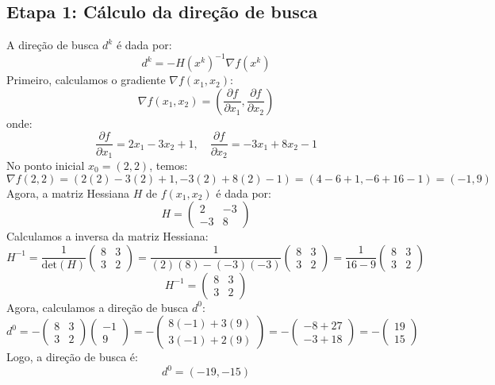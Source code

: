 \documentclass[a4paper, 12pt]{article}
\begin{document}
\subsection{Etapa 1: Cálculo da direção de busca}
A direção de busca \( d^k \) é dada por:
\[
d^k = -H(x^k)^{-1} \nabla f(x^k)
\]
Primeiro, calculamos o gradiente \( \nabla f(x_1, x_2) \):
\[
\nabla f(x_1, x_2) = \left( \frac{\partial f}{\partial x_1}, \frac{\partial f}{\partial x_2} \right)
\]
onde:
\[
\frac{\partial f}{\partial x_1} = 2x_1 - 3x_2 + 1, \quad \frac{\partial f}{\partial x_2} = -3x_1 + 8x_2 - 1
\]
No ponto inicial \( x_0 = (2, 2) \), temos:
\[
\nabla f(2, 2) = (2(2) - 3(2) + 1, -3(2) + 8(2) - 1) = (4 - 6 + 1, -6 + 16 - 1) = (-1, 9)
\]
Agora, a matriz Hessiana \( H \) de \( f(x_1, x_2) \) é dada por:
\[
H = \begin{pmatrix} 2 & -3 \\ -3 & 8 \end{pmatrix}
\]
Calculamos a inversa da matriz Hessiana:
\[
H^{-1} = \frac{1}{\text{det}(H)} \begin{pmatrix} 8 & 3 \\ 3 & 2 \end{pmatrix} = \frac{1}{(2)(8) - (-3)(-3)} \begin{pmatrix} 8 & 3 \\ 3 & 2 \end{pmatrix} = \frac{1}{16 - 9} \begin{pmatrix} 8 & 3 \\ 3 & 2 \end{pmatrix}
\]
\[
H^{-1} = \begin{pmatrix} 8 & 3 \\ 3 & 2 \end{pmatrix}
\]
Agora, calculamos a direção de busca \( d^0 \):
\[
d^0 = -\begin{pmatrix} 8 & 3 \\ 3 & 2 \end{pmatrix} \begin{pmatrix} -1 \\ 9 \end{pmatrix} = -\begin{pmatrix} 8(-1) + 3(9) \\ 3(-1) + 2(9) \end{pmatrix} = -\begin{pmatrix} -8 + 27 \\ -3 + 18 \end{pmatrix} = -\begin{pmatrix} 19 \\ 15 \end{pmatrix}
\]
Logo, a direção de busca é:
\[
d^0 = (-19, -15)
\]
\end{document}

